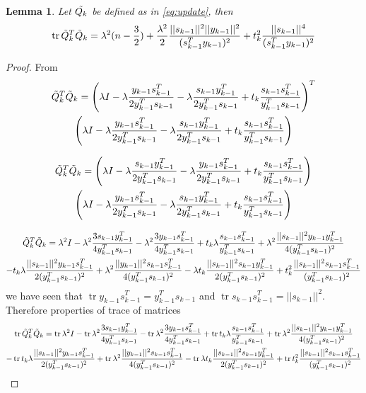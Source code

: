 \documentclass{article}
\newtheorem{lemma}{Lemma}
\theoremstyle{remark}
\newcommand{\tr}{\operatorname{tr}}
\begin{document}
{\begin{lemma}
\label{A2}
   Let $\Tilde{Q_k}$ be defined as in \eqref{eq:update}, then
  \[
  \tr{\Tilde{Q}_k^T\Tilde{Q}_k}=\lambda^2( n-\frac{3}{2})+\frac{\lambda^2}{2}\frac{||s_{k-1}||^2||y_{k-1}||^2}{(s_{k-1}^Ty_{k-1})^2}+t_k^2\frac{||s_{k-1}||^4}{(s_{k-1}^Ty_{k-1})^2}\]
\end{lemma}
\begin{proof}
    From 
    \begin{multline*}
    \Tilde{Q}_k^T\Tilde{Q}_k=\left(\lambda I-\lambda\frac{y_{k-1}s_{k-1}^T}{2y_{k-1}^Ts_{k-1}}-\lambda\frac{s_{k-1}y_{k-1}^T}{2y_{k-1}^Ts_{k-1}}+t_k\frac{s_{k-1}s_{k-1}^T}{y_{k-1}^Ts_{k-1}}\right)^T\\
    \left(\lambda I
    -\lambda\frac{y_{k-1}s_{k-1}^T}{2y_{k-1}^Ts_{k-1}}-\lambda\frac{s_{k-1}y_{k-1}^T}{2y_{k-1}^Ts_{k-1}}+t_k\frac{s_{k-1}s_{k-1}^T}{y_{k-1}^Ts_{k-1}}\right)
    \end{multline*}
    
   \begin{multline*}
    \Tilde{Q}_k^T\Tilde{Q}_k=\left(\lambda I-\lambda\frac{s_{k-1}y_{k-1}^T}{2y_{k-1}^Ts_{k-1}}-\lambda\frac{y_{k-1}s_{k-1}^T}{2y_{k-1}^Ts_{k-1}}+t_k\frac{s_{k-1}s_{k-1}^T}{y_{k-1}^Ts_{k-1}}\right)\\
    \left(\lambda I
    -\lambda\frac{y_{k-1}s_{k-1}^T}{2y_{k-1}^Ts_{k-1}}-\lambda\frac{s_{k-1}y_{k-1}^T}{2y_{k-1}^Ts_{k-1}}+t_k\frac{s_{k-1}s_{k-1}^T}{y_{k-1}^Ts_{k-1}}\right)
    \end{multline*}

   \begin{multline*}
    \Tilde{Q}_k^T\Tilde{Q}_k=\lambda^2 I-\lambda^2\frac{3s_{k-1}y_{k-1}^T}{4y_{k-1}^Ts_{k-1}}-\lambda^2\frac{3y_{k-1}s_{k-1}^T}{4y_{k-1}^Ts_{k-1}}+t_k\lambda\frac{s_{k-1}s_{k-1}^T}{y_{k-1}^Ts_{k-1}}+\lambda^2\frac{||s_{k-1}||^2y_{k-1}y_{k-1}^T}{4(y_{k-1}^Ts_{k-1})^2}\\-t_k\lambda\frac{||s_{k-1}||^2y_{k-1}s_{k-1}^T}{2(y_{k-1}^Ts_{k-1})^2}+\lambda^2\frac{||y_{k-1}||^2s_{k-1}s_{k-1}^T}{4(y_{k-1}^Ts_{k-1})^2}-\lambda t_k\frac{||s_{k-1}||^2s_{k-1}y_{k-1}^T}{2(y_{k-1}^Ts_{k-1})^2}+t_k^2\frac{||s_{k-1}||^2s_{k-1}s_{k-1}^T}{(y_{k-1}^Ts_{k-1})^2}
    \end{multline*}
    we have seen that $\tr{y_{k-1}s_{k-1}^T}=y_{k-1}^Ts_{k-1}$ and $\tr{s_{k-1}s_{k-1}^T}=||s_{k-1}||^2$. Therefore
    properties of trace of matrices
    \begin{multline*}
    \tr{\Tilde{Q}_k^T\Tilde{Q}_k}=\tr{\lambda^2 I}-\tr{\lambda^2\frac{3s_{k-1}y_{k-1}^T}{4y_{k-1}^Ts_{k-1}}}-\tr{\lambda^2\frac{3y_{k-1}s_{k-1}^T}{4y_{k-1}^Ts_{k-1}}}+\tr{t_k\lambda\frac{s_{k-1}s_{k-1}^T}{y_{k-1}^Ts_{k-1}}}+\tr{\lambda^2\frac{||s_{k-1}||^2y_{k-1}y_{k-1}^T}{4(y_{k-1}^Ts_{k-1})^2}}\\-\tr{t_k\lambda\frac{||s_{k-1}||^2y_{k-1}s_{k-1}^T}{2(y_{k-1}^Ts_{k-1})^2}}+\tr{\lambda^2\frac{||y_{k-1}||^2s_{k-1}s_{k-1}^T}{4(y_{k-1}^Ts_{k-1})^2}}-\tr{\lambda t_k\frac{||s_{k-1}||^2s_{k-1}y_{k-1}^T}{2(y_{k-1}^Ts_{k-1})^2}}+\tr{t_k^2\frac{||s_{k-1}||^2s_{k-1}s_{k-1}^T}{(y_{k-1}^Ts_{k-1})^2}}
   \end{multline*}
   

\end{proof}}
\end{document}
